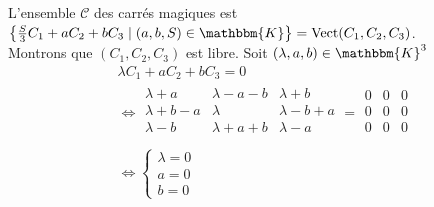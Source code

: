 L'ensemble $\mathcal{C}$ des carrés magiques est $\left\{ \frac{S}{3}C_1+aC_2+bC_3 \mid (a,b,S) \in \mathbbm{K} \right\} = \Vect(C_1,C_2,C_3)$.\\

Montrons que $(C_1,C_2, C_3)$ est libre. Soit $(\lambda, a,b)\in \mathbbm{K}^3$\\
\begin{align*}
	&\lambda C_1 + a C_2 + b C_3 = 0\\
	&\iff
	\begin{array}
		{c|c|c}
		\lambda+a&\lambda-a-b&\lambda+b\\ \hline
		\lambda+b-a&\lambda&\lambda-b + a\\ \hline
		\lambda-b&\lambda+a+b&\lambda-a\\
	\end{array} = 
	\begin{array}
		{c|c|c}
		0&0&0\\ \hline
		0&0&0\\ \hline
		0&0&0\\
	\end{array}\\
	&\iff \begin{cases}
		\lambda = 0\\
		a = 0\\
		b = 0
	\end{cases}
\end{align*}

